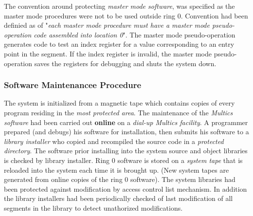 The convention around protecting \textit{master mode software}, was specified as the master mode procedures
were not to be used outside ring 0. Convention had been definied as of "\textit{each master mode procedure must 
have a master mode pseudo-operation code assembled into location 0}".
The master mode pseudo-operation generates code to test an index register for a value corresponding to an 
entry point in the segment. If the index register is invalid, the master mode pseudo-operation saves the
registers for debugging and shuts the system down.

\subsubsection{Software Maintenancee Procedure}

The system is initialized from a magnetic tape which contains copies of every program residing in the \textit{most protected 
area}. The maintenance of the \textit{Multics software} had been carried out \textbf{online} on a \textit{dial-up 
Multics facility}. A programmer prepared (and debugs) his software for installation, then submits his
software to a \textit{library installer} who copied and recompiled the source code in a \textit{protected 
directory}. 
The software prior installing into the system source and object libraries is checked by library installer.
Ring 0 software is stored on a \textit{system tape} that is reloaded into the system each time it is brought up.
(New system tapes are generated from online copies of the ring 0 software).
The system libraries had been protected against modification by access control list mechanism. In addition 
the library installers had been periodically checked of last modification of all segments in the library to
detect unathorized modifications.